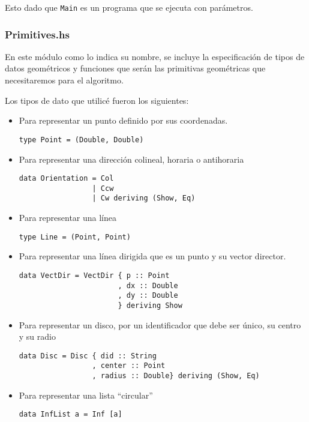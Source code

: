 \documentclass[12pt]{article}
\begin{document}
Esto dado que \texttt{Main} es un programa que se ejecuta con parámetros.

\subsubsection*{Primitives.hs}

\noindent En este módulo como lo indica su nombre, se incluye la especificación de tipos de datos geométricos y funciones que serán las primitivas geométricas que necesitaremos para el algoritmo.

Los tipos de dato que utilicé fueron los siguientes:

\begin{itemize}
\item Para representar un punto definido por sus coordenadas.

  \begin{verbatim}
type Point = (Double, Double)
  \end{verbatim}

\item Para representar una dirección colineal, horaria o antihoraria

  \begin{verbatim}
data Orientation = Col
                 | Ccw
                 | Cw deriving (Show, Eq)
  \end{verbatim}

\item Para representar una línea

  \begin{verbatim}
type Line = (Point, Point)  
  \end{verbatim}

\item Para representar una línea dirigida que es un punto y su vector director.

  \begin{verbatim}
data VectDir = VectDir { p :: Point
                       , dx :: Double
                       , dy :: Double
                       } deriving Show
  \end{verbatim}

\item Para representar un disco, por un identificador que debe ser único, su centro y su radio

  \begin{verbatim}
data Disc = Disc { did :: String
                 , center :: Point
                 , radius :: Double} deriving (Show, Eq)
  \end{verbatim}

\item Para representar una lista ``circular''

  \begin{verbatim}
data InfList a = Inf [a]
  \end{verbatim}
  
\end{itemize}
\end{document}
